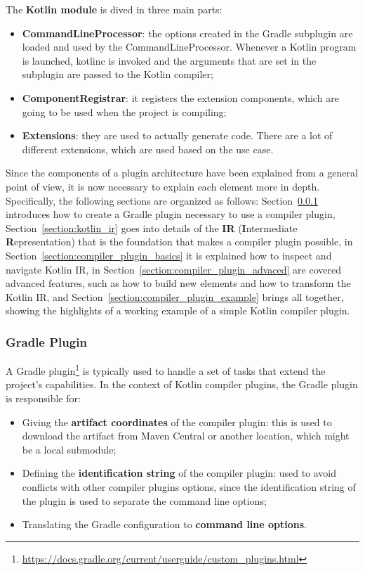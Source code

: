 \noindent The \textbf{Kotlin module} is dived in three main parts:
\begin{itemize}
    \item \textbf{CommandLineProcessor}: the options created in the Gradle subplugin are loaded and used by the CommandLineProcessor. Whenever a Kotlin program is launched, kotlinc is invoked and the arguments that are set in the subplugin are passed to the Kotlin compiler;
    \item \textbf{ComponentRegistrar}: it registers the extension components, which are going to be used when the project is compiling;
    \item \textbf{Extensions}: they are used to actually generate code. There are a lot of different extensions, which are used based on the use case.
\end{itemize}

Since the components of a plugin architecture have been explained from a general point of view, it is now necessary to explain each element more in depth.\newline
Specifically, the following sections are organized as follows: Section~\ref{section:gradle_plugin} introduces how to create a Gradle plugin necessary to use a compiler plugin, Section~\ref{section:kotlin_ir} goes into details of the \textbf{IR} (\textbf{I}ntermediate \textbf{R}epresentation) that is the foundation that makes a compiler plugin possible, in Section~\ref{section:compiler_plugin_basics} it is explained how to inspect and navigate Kotlin IR, in Section~\ref{section:compiler_plugin_advaced} are covered advanced features, such as how to build new elements and how to transform the Kotlin IR, and Section~\ref{section:compiler_plugin_example} brings all together, showing the highlights of a working example of a simple Kotlin compiler plugin.

\subsubsection{Gradle Plugin}\label{section:gradle_plugin}
A Gradle plugin\footnote{\url{https://docs.gradle.org/current/userguide/custom_plugins.html}} is typically used to handle a set of tasks that extend the project's capabilities.\newline
In the context of Kotlin compiler plugins, the Gradle plugin is responsible for:
\begin{itemize}
    \item Giving the \textbf{artifact coordinates} of the compiler plugin: this is used to download the artifact from Maven Central or another location, which might be a local submodule;
    \item Defining the \textbf{identification string} of the compiler plugin: used to avoid conflicts with other compiler plugins options, since the identification string of the plugin is used to separate the command line options;
    \item Translating the Gradle configuration to \textbf{command line options}.
\end{itemize}

